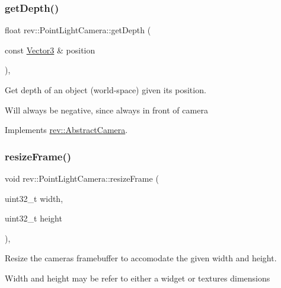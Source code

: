 \mbox{\label{classrev_1_1_point_light_camera_adfa53b5dd87fb570e4d238ccafc7cd5d}} 
\subsubsection{\texorpdfstring{getDepth()}{getDepth()}}
{\footnotesize\ttfamily float rev\+::\+Point\+Light\+Camera\+::get\+Depth (\begin{DoxyParamCaption}\item[{const \mbox{\hyperlink{classrev_1_1_vector}{Vector3}} \&}]{position }\end{DoxyParamCaption})\hspace{0.3cm}{\ttfamily [override]}, {\ttfamily [virtual]}}



Get depth of an object (world-\/space) given its position. 

Will always be negative, since always in front of camera 

Implements \mbox{\hyperlink{classrev_1_1_abstract_camera_aad3a00ed805121a7915574b4125a343f}{rev\+::\+Abstract\+Camera}}.

\mbox{\label{classrev_1_1_point_light_camera_afff4fe381e8872b5db8cbc7f573e3ca9}} 
\subsubsection{\texorpdfstring{resizeFrame()}{resizeFrame()}}
{\footnotesize\ttfamily void rev\+::\+Point\+Light\+Camera\+::resize\+Frame (\begin{DoxyParamCaption}\item[{uint32\+\_\+t}]{width,  }\item[{uint32\+\_\+t}]{height }\end{DoxyParamCaption})\hspace{0.3cm}{\ttfamily [override]}, {\ttfamily [virtual]}}



Resize the camera\textquotesingle{}s framebuffer to accomodate the given width and height. 

Width and height may be refer to either a widget or texture\textquotesingle{}s dimensions 

